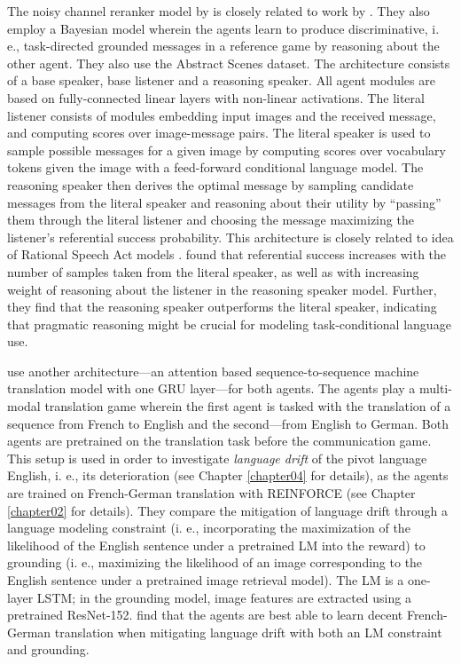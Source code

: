 The noisy channel reranker model by \cite{lazaridou2020multi} is closely related to work by \cite{andreas2016reasoning}. They also employ a Bayesian model wherein the agents learn to produce discriminative, i. e., task-directed grounded messages in a reference game by reasoning about the other agent. They also use the Abstract Scenes dataset. The architecture consists of a base speaker, base listener and a reasoning speaker. All agent modules are based on fully-connected linear layers with non-linear activations. The literal listener consists of modules embedding input images and the received message, and computing scores over image-message pairs. The literal speaker is used to sample possible messages for a given image by computing scores over vocabulary tokens given the image with a feed-forward conditional language model. The reasoning speaker then derives the optimal message by sampling candidate messages from the literal speaker and reasoning about their utility by ``passing'' them through the literal listener and choosing the message maximizing the listener's referential success probability. This architecture is closely related to idea of Rational Speech Act models \parencite{goodman2016pragmatic}. 
\cite{andreas2016reasoning} found that referential success increases with the number of samples taken from the literal speaker, as well as with increasing weight of reasoning about the listener in the reasoning speaker model. Further, they find that the reasoning speaker outperforms the literal speaker, indicating that pragmatic reasoning might be crucial for modeling task-conditional language use. 

\cite{lee2019countering} use another architecture---an attention based sequence-to-sequence machine translation model with one GRU layer---for both agents. 
The agents play a multi-modal translation game wherein the first agent is tasked with the translation of a sequence from French to English and the second---from English to German. Both agents are pretrained on the translation task before the communication game. This setup is used in order to investigate \textit{language drift} of the pivot language English, i. e., its deterioration (see Chapter \ref{chapter04} for details), as the agents are trained on French-German translation with REINFORCE (see Chapter \ref{chapter02} for details). They compare the mitigation of language drift through a language modeling constraint (i. e., incorporating the maximization of the likelihood of the English sentence under a pretrained LM into the reward) to grounding (i. e., maximizing the likelihood of an image corresponding to the English sentence under a pretrained image retrieval model). The LM is a one-layer LSTM; in the grounding model, image features are extracted using a pretrained ResNet-152. \cite{lee2019countering} find that the agents are best able to learn decent French-German translation when mitigating language drift with both an LM constraint and grounding. 

